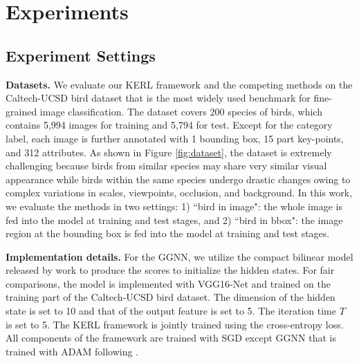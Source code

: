 \documentclass{article}
\begin{document}
\section{Experiments}

\subsection{Experiment Settings}
\label{sec:exp}
\noindent\textbf{Datasets. }We evaluate our KERL framework and the competing methods on the Caltech-UCSD bird dataset \cite{wah2011caltech} that is the most widely used benchmark for fine-grained image classification. The dataset covers 200 species of birds, which contains 5,994 images for training and 5,794 for test. Except for the category label, each image is further annotated with 1 bounding box, 15 part key-points, and 312 attributes. As shown in Figure \ref{fig:dataset}, the dataset is extremely challenging because birds from similar species may share very similar visual appearance while birds within the same species undergo drastic changes owing to complex variations in scales, viewpoints, occlusion, and background. In this work, we evaluate the methods in two settings: 1) ``bird in image": the whole image is fed into the model at training and test stages, and 2) ``bird in bbox": the image region at the bounding box is fed into the model at training and test stages. 


\noindent\textbf{Implementation details. }For the GGNN, we utilize the compact bilinear model released by work \cite{gao2016compact} to produce the scores to initialize the hidden states. For fair comparisons, the model is implemented with VGG16-Net and trained on the training part of the Caltech-UCSD bird dataset. The dimension of the hidden state is set to 10 and that of the output feature is set to 5. The iteration time $T$ is set to 5. The KERL framework is jointly trained using the cross-entropy loss. All components of the framework are trained with SGD except GGNN that is trained with ADAM following \cite{marino2017more}. 
\end{document}
